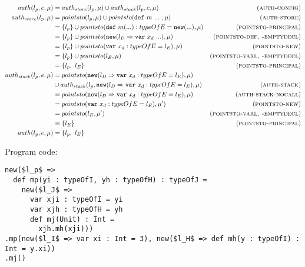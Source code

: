 \documentclass{llncs}
\newcommand{\keywadj}[1]{\mathtt{#1}}
\newcommand{\keyw}[1]{\keywadj{#1}~}
\begin{document}
\begin{align*}
auth(l_p, e, \mu) &= auth_{store}(l_p, \mu) \cup auth_{stack}(l_p, e, \mu) & (\textsc{auth-config})\\
auth_{store}(l_p, \mu) &= pointsto(l_p, \mu) \cup pointsto(\keyw{def} m~...~, \mu) & (\textsc{auth-store})\\
 &= \{ l_p \} \cup pointsto(\keyw{def} m(...) : typeOfE = \keywadj{new}(...), \mu) & (\textsc{pointsto-principal})\\
 &= \{ l_p \} \cup pointsto(\keywadj{new}(l_D \Rightarrow \keyw{var} x_d~...), \mu) & (\textsc{pointsto-def, -emptydecl})\\
 &= \{ l_p \} \cup pointsto(\keyw{var} x_d : typeOfE = l_E), \mu) & (\textsc{pointsto-new})\\
 &= \{ l_p \} \cup pointsto(l_E, \mu) & (\textsc{pointsto-varl, -emptydecl})\\ 
 &= \{ l_p,~l_E \} & (\textsc{pointsto-principal})\\
auth_{stack}(l_p, e, \mu) &= pointsto(\keywadj{new}(l_D \Rightarrow \keyw{var} x_d : typeOfE = l_E), \mu) &\\
 &\cup auth_{stack}(l_p, \keywadj{new}(l_D \Rightarrow \keyw{var} x_d : typeOfE = l_E), \mu) & (\textsc{auth-stack})\\
 &= pointsto(\keywadj{new}(l_D \Rightarrow \keyw{var} x_d : typeOfE = l_E), \mu) & (\textsc{auth-stack-nocall})\\
 &= pointsto(\keyw{var} x_d : typeOfE = l_E), \mu') & (\textsc{pointsto-new})\\
 &= pointsto(l_E, \mu') & (\textsc{pointsto-varl, -emptydecl})\\ 
 &= \{ l_E \} & (\textsc{pointsto-principal})\\
auth(l_p, e, \mu) &=  \{ l_p,~l_E\}&\\
\end{align*}


\newpage

\noindent\underline{}

\vspace{16pt}

\noindent Program code:
\vspace{-6pt}
\begin{lstlisting}[xleftmargin=20pt]
new($l_p$ =>
  def mp(yi : typeOfI, yh : typeOfH) : typeOfJ =
    new($l_J$ =>
      var xji : typeOfI = yi
      var xjh : typeOfH = yh
      def mj(Unit) : Int =
        xjh.mh(xji)))
.mp(new($l_I$ => var xi : Int = 3), new($l_H$ => def mh(y : typeOfI) : Int = y.xi))
.mj()
\end{lstlisting}
\end{document}
